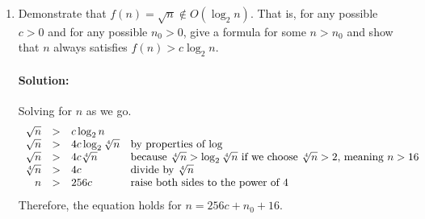 \documentclass{article}
\begin{document}
\begin{enumerate}
\begin{enumerate}
    \bigskip

    \pagebreak[3]
  \item Demonstrate that
    \(f(n) = \sqrt{n} \not\in O(\log_2 n)\).
    That is, for any possible \(c>0\) and for any possible \(n_0 > 0\), give a
    formula for some \(n > n_0\) and show that \(n\) always satisfies
    \(f(n) > c \log_2 n\).

    \paragraph{Solution:} Solving for \(n\) as we go.
    \[
    \begin{array}{rcll}
      \sqrt{n} &>& c \log_2 n \\
      \sqrt{n} &>& 4c \log_2 \sqrt[4]{n}
      & $by properties of $ \log \\
      \sqrt{n} &>& 4c \sqrt[4]{n}
      & $because $  \sqrt[4]{n} > \log_2 \sqrt[4]{n}
      $ if we choose $ \sqrt[4]{n} > 2 $, meaning $ n > 16 \\
      \sqrt[4]{n} &>& 4c
      & $divide by $ \sqrt[4]n \\
      n &>& 256c
      & $raise both sides to the power of 4$ \\
    \end{array}
    \]
    Therefore, the equation holds for \(n=256c+n_0+16\).

  \end{enumerate}

\end{enumerate}
\end{document}

